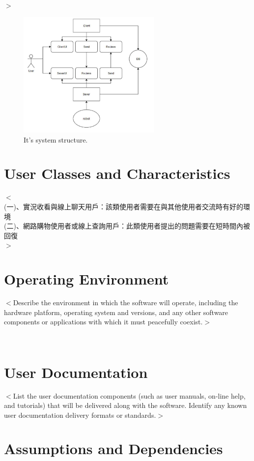 \documentclass{scrreprt}
\begin{document}
\begin{CJK}{UTF8}{bkai}
$>$

\begin{figure}[h]
\begin{center}
\includegraphics[width=7cm]{structure.jpg}
\end{center}
\caption{It's system structure.}
\label{fig:1}
\end{figure}






\section{User Classes and Characteristics}
$<$\\
(一)、實況收看與線上聊天用戶：該類使用者需要在與其他使用者交流時有好的環境\\
(二)、網路購物使用者或線上查詢用戶：此類使用者提出的問題需要在短時間內被回復\\
$>$

\section{Operating Environment}
$<$Describe the environment in which the software will operate, including the 
hardware platform, operating system and versions, and any other software 
components or applications with which it must peacefully coexist.$>$



\iffalse　　%
\section{User Documentation}
$<$List the user documentation components (such as user manuals, on-line help, 
and tutorials) that will be delivered along with the software. Identify any 
known user documentation delivery formats or standards.$>$
\section{Assumptions and Dependencies}


\end{CJK}
\end{document}
